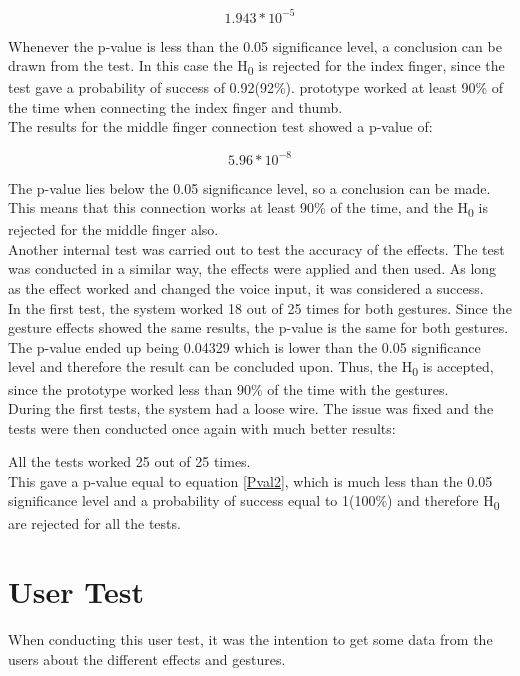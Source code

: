 \begin{equation}
	1.943*10^{-5}
\end{equation} 

Whenever the p-value is less than the 0.05 significance level, a conclusion can be drawn from the test. In this case the H\textsubscript{0} is rejected for the index finger, since the test gave a probability of success of 0.92(92\%).
prototype worked at least 90\% of the time when connecting the index finger and thumb. \\

The results for the middle finger connection test showed a p-value of:

\begin{equation}\label{Pval2}
	5.96*10^{-8}
\end{equation} 

The p-value lies below the 0.05 significance level, so a conclusion can be made. This means that this connection works at least 90\% of the time, and the H\textsubscript{0} is rejected for the middle finger also. \\

Another internal test was carried out to test the accuracy of the effects. The test was conducted in a similar way, the effects were applied and then used. 
As long as the effect worked and changed the voice input, it was considered a success. \\

In the first test, the system worked 18 out of 25 times for both gestures.
Since the gesture effects showed the same results, the p-value is the same for both gestures. 
The p-value ended up being 0.04329 which is lower than the 0.05 significance level and therefore the result can be concluded upon. Thus, the H\textsubscript{0} is accepted, since the prototype worked less than 90\% of the time with the gestures. \\

During the first tests, the system had a loose wire. The issue was fixed and the tests were then conducted once again with much better results:

All the tests worked 25 out of 25 times. \\

This gave a p-value equal to equation \ref{Pval2}, which is much less than the 0.05 significance level and a probability of success equal to 1(100\%) and therefore H\textsubscript{0} are rejected for all the tests.

\section{User Test}
When conducting this user test, it was the intention to get some data from the users about the different effects and gestures. 

